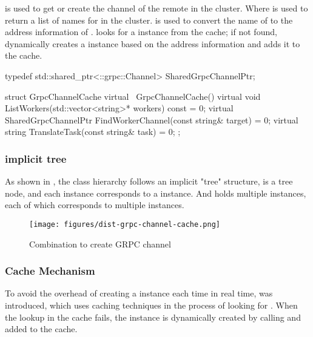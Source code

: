 \begin{content}
 is used to get or create the  channel of the remote  in the cluster. Where  is used to return a list of names for  in the cluster.  is used to convert the name of  to the address information of .  looks for a  instance from the cache; if not found, dynamically creates a  instance based on the address information and adds it to the cache.

\begin{leftbar}
\begin{c++}
typedef std::shared_ptr<::grpc::Channel> SharedGrpcChannelPtr;

struct GrpcChannelCache {
  virtual ~GrpcChannelCache() {}
  virtual void ListWorkers(std::vector<string>* workers) const = 0;
  virtual SharedGrpcChannelPtr FindWorkerChannel(const string& target) = 0;
  virtual string TranslateTask(const string& task) = 0;
};
\end{c++}
\end{leftbar}

\subsubsection{implicit tree}

As shown in , the  class hierarchy follows an implicit "tree" structure,  is a tree node, and each instance corresponds to a  instance. And  holds multiple  instances, each of which corresponds to multiple  instances.

\begin{figure}[H]
\centering
\texttt{[image: figures/dist-grpc-channel-cache.png]}
\caption{Combination to create GRPC channel}
 \label{fig:dist-grpc-channel-cache}
\end{figure}

\subsubsection{Cache Mechanism}

To avoid the overhead of creating a  instance each time in real time,  was introduced, which uses caching techniques in the process of looking for . When the lookup in the cache fails, the  instance is dynamically created by calling  and added to the cache.


\end{content}
